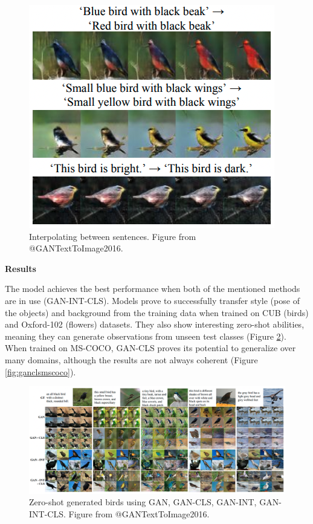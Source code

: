 \documentclass[
]{krantz}
\begin{document}
\begin{figure}

{\centering \includegraphics[width=0.6\linewidth]{figures/02-02-text-2-img/interpolatingbirds} 

}

\caption{Interpolating between sentences. Figure from @GANTextToImage2016.}\label{fig:interpolatingbirds}
\end{figure}

\textbf{Results}

The model achieves the best performance when both of the mentioned methods are in use (GAN-INT-CLS). Models prove to successfully transfer style (pose of the objects) and background from the training data when trained on CUB (birds) and Oxford-102 (flowers) datasets. They also show interesting zero-shot abilities, meaning they can generate observations from unseen test classes (Figure \ref{fig:ganclszeroshot}). When trained on MS-COCO, GAN-CLS proves its potential to generalize over many domains, although the results are not always coherent (Figure \ref{fig:ganclsmscoco}).

\begin{figure}

{\centering \includegraphics[width=1\linewidth]{figures/02-02-text-2-img/ganclszeroshot} 

}

\caption{Zero-shot generated birds using GAN, GAN-CLS, GAN-INT, GAN-INT-CLS. Figure from @GANTextToImage2016.}\label{fig:ganclszeroshot}
\end{figure}
\end{document}

